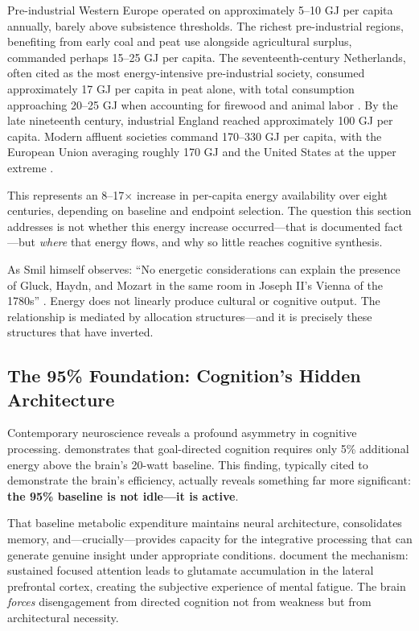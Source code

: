 Pre-industrial Western Europe operated on approximately 5--10 GJ per capita annually, barely above subsistence thresholds. The richest pre-industrial regions, benefiting from early coal and peat use alongside agricultural surplus, commanded perhaps 15--25 GJ per capita. The seventeenth-century Netherlands, often cited as the most energy-intensive pre-industrial society, consumed approximately 17 GJ per capita in peat alone, with total consumption approaching 20--25 GJ when accounting for firewood and animal labor \citep{dezeeuw1978}. By the late nineteenth century, industrial England reached approximately 100 GJ per capita. Modern affluent societies command 170--330 GJ per capita, with the European Union averaging roughly 170 GJ and the United States at the upper extreme \citep{smil2017}.

This represents an 8--17$\times$ increase in per-capita energy availability over eight centuries, depending on baseline and endpoint selection. The question this section addresses is not whether this energy increase occurred---that is documented fact---but \textit{where} that energy flows, and why so little reaches cognitive synthesis.

As Smil himself observes: ``No energetic considerations can explain the presence of Gluck, Haydn, and Mozart in the same room in Joseph II's Vienna of the 1780s'' \citep{smil2017}. Energy does not linearly produce cultural or cognitive output. The relationship is mediated by allocation structures---and it is precisely these structures that have inverted.

\subsection{The 95\% Foundation: Cognition's Hidden Architecture}

Contemporary neuroscience reveals a profound asymmetry in cognitive processing. \citet{jamadar2025} demonstrates that goal-directed cognition requires only 5\% additional energy above the brain's 20-watt baseline. This finding, typically cited to demonstrate the brain's efficiency, actually reveals something far more significant: \textbf{the 95\% baseline is not idle---it is active}.

That baseline metabolic expenditure maintains neural architecture, consolidates memory, and---crucially---provides capacity for the integrative processing that can generate genuine insight under appropriate conditions. \citet{wiehler2022} document the mechanism: sustained focused attention leads to glutamate accumulation in the lateral prefrontal cortex, creating the subjective experience of mental fatigue. The brain \textit{forces} disengagement from directed cognition not from weakness but from architectural necessity.

